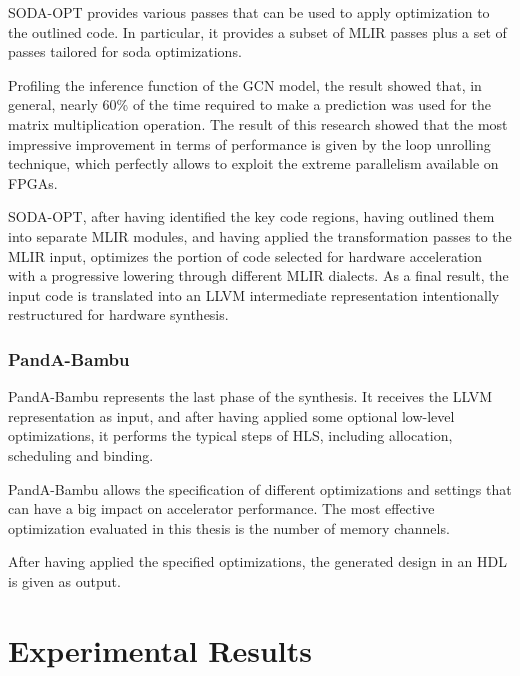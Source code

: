 \documentclass[11pt,a4paper,twocolumn]{article}
\begin{document}
SODA-OPT provides various passes that can be used to apply optimization to the outlined code.
In particular, it provides a subset of MLIR passes plus a set of passes tailored for soda optimizations.

Profiling the inference function of the GCN model, the result showed that, in general, nearly 60\% of the time required to make a prediction was used for the matrix multiplication operation.
The result of this research showed that the most impressive improvement in terms of performance is given by the loop unrolling technique, which perfectly allows to exploit the extreme parallelism available on FPGAs.

SODA-OPT, after having identified the key code regions, having outlined them into separate MLIR modules, and having applied the transformation passes to the MLIR input, optimizes the portion of code selected for hardware acceleration with a progressive lowering through different MLIR dialects.
As a final result, the input code is translated into an LLVM intermediate representation intentionally restructured for hardware synthesis.

\subsubsection*{PandA-Bambu}
\label{subsec:bambu}%

PandA-Bambu represents the last phase of the synthesis.
It receives the LLVM representation as input, and after having applied some optional low-level optimizations, it performs the typical steps of HLS, including allocation, scheduling and binding.

PandA-Bambu allows the specification of different optimizations and settings that can have a big impact on accelerator performance.
The most effective optimization evaluated in this thesis is the number of memory channels.

After having applied the specified optimizations, the generated design in an HDL is given as output.


\section{Experimental Results}
\label{sec:experimental-results}%
\end{document}
